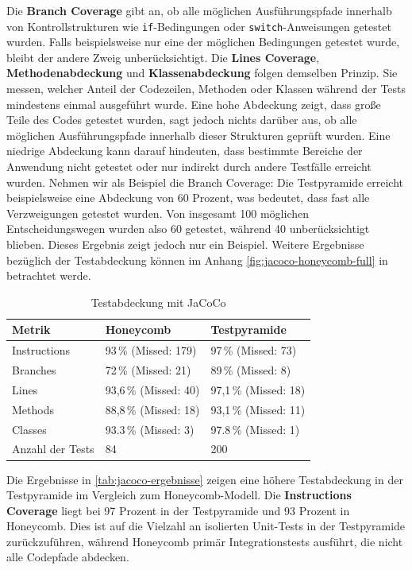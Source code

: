 Die \textbf{Branch Coverage} gibt an, ob alle möglichen Ausführungspfade innerhalb von Kontrollstrukturen wie \texttt{if}-Bedingungen oder \texttt{switch}-Anweisungen getestet wurden. Falls beispielsweise nur eine der möglichen Bedingungen getestet wurde, bleibt der andere Zweig unberücksichtigt. Die \textbf{Lines Coverage}, \textbf{Methodenabdeckung} und \textbf{Klassenabdeckung} folgen demselben Prinzip. Sie messen, welcher Anteil der Codezeilen, Methoden oder Klassen während der Tests mindestens einmal ausgeführt wurde. Eine hohe Abdeckung zeigt, dass große Teile des Codes getestet wurden, sagt jedoch nichts darüber aus, ob alle möglichen Ausführungspfade innerhalb dieser Strukturen geprüft wurden. Eine niedrige Abdeckung kann darauf hindeuten, dass bestimmte Bereiche der Anwendung nicht getestet oder nur indirekt durch andere Testfälle erreicht wurden.
Nehmen wir als Beispiel die Branch Coverage: Die Testpyramide erreicht beispielsweise eine Abdeckung von 60 Prozent, was bedeutet, dass fast alle Verzweigungen getestet wurden. Von insgesamt 100 möglichen Entscheidungswegen wurden also 60 getestet, während 40 unberücksichtigt blieben. Dieses Ergebnis zeigt jedoch nur ein Beispiel. Weitere Ergebnisse bezüglich der Testabdeckung können im Anhang \autoref{fig:jacoco-honeycomb-full} in betrachtet werde. 
\begin{table}[H]
	\centering
	\begin{tabular}{|l|l|l|}
		\hline
		\textbf{Metrik}       & \textbf{Honeycomb} & \textbf{Testpyramide} \\ \hline
		Instructions          & 93\,\% (Missed: 179)  & 97\,\% (Missed: 73)   \\ \hline
		Branches              & 72\,\% (Missed: 21)   & 89\,\% (Missed: 8)    \\ \hline
		Lines                 & 93,6\,\% (Missed: 40)  & 97,1\,\% (Missed: 18)  \\ \hline
		Methods               & 88,8\,\% (Missed: 18) & 93,1\,\% (Missed: 11) \\ \hline
		Classes               & 93.3\,\% (Missed: 3)  & 97.8\,\% (Missed: 1)  \\ \hline
		Anzahl der Tests      & 84                   & 200                   \\ \hline
	\end{tabular}
	\caption{Testabdeckung mit JaCoCo}
	\label{tab:jacoco-ergebnisse}
\end{table}
Die Ergebnisse in \autoref{tab:jacoco-ergebnisse} zeigen eine höhere Testabdeckung in der Testpyramide im Vergleich zum Honeycomb-Modell. Die \textbf{Instructions Coverage} liegt bei 97 Prozent in der Testpyramide und 93 Prozent in Honeycomb. Dies ist auf die Vielzahl an isolierten Unit-Tests in der Testpyramide zurückzuführen, während Honeycomb primär Integrationstests ausführt, die nicht alle Codepfade abdecken. 

